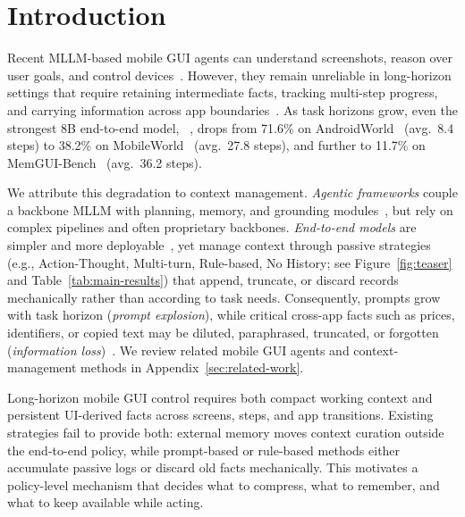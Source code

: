 \section{Introduction}
\label{sec:intro}
\vspace{-0.3em}

Recent MLLM-based mobile GUI agents can understand screenshots, reason over user goals, and control devices~\cite{gao2026ui,zhou2025mai,hong2024cogagent,xu2026mobile,liu2025llm}. However, they remain unreliable in long-horizon settings that require retaining intermediate facts, tracking multi-step progress, and carrying information across app boundaries~\cite{liu2026memgui,kong2025mobileworld}. As task horizons grow, even the strongest 8B end-to-end model, ~\cite{xu2026mobile}, drops from 71.6\% on AndroidWorld~\cite{rawles2025androidworld} (avg.\ 8.4 steps) to 38.2\% on MobileWorld~\cite{kong2025mobileworld} (avg.\ 27.8 steps), and further to 11.7\% on MemGUI-Bench~\cite{liu2026memgui} (avg.\ 36.2 steps).



We attribute this degradation to context management. \emph{Agentic frameworks} couple a backbone MLLM with planning, memory, and grounding modules~\cite{agashe2025agent,rawles2025androidworld,wang2024mobile,wang2025mobileagentselfevolving}, but rely on complex pipelines and often proprietary backbones. \emph{End-to-end models} are simpler and more deployable~\cite{gao2026ui,zhou2025mai,xu2026mobile}, yet manage context through passive strategies (e.g., Action-Thought, Multi-turn, Rule-based, No History; see Figure~\ref{fig:teaser} and Table~\ref{tab:main-results}) that append, truncate, or discard records mechanically rather than according to task needs. Consequently, prompts grow with task horizon (\emph{prompt explosion}), while critical cross-app facts such as prices, identifiers, or copied text may be diluted, paraphrased, truncated, or forgotten (\emph{information loss})~\cite{liu2026memgui}. We review related mobile GUI agents and context-management methods in Appendix~\ref{sec:related-work}.

Long-horizon mobile GUI control requires both compact working context and persistent UI-derived facts across screens, steps, and app transitions. Existing strategies fail to provide both: external memory moves context curation outside the end-to-end policy, while prompt-based or rule-based methods either accumulate passive logs or discard old facts mechanically. This motivates a policy-level mechanism that decides what to compress, what to remember, and what to keep available while acting.


